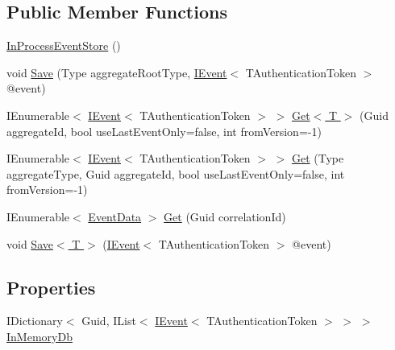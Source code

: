 \subsection*{Public Member Functions}
\begin{DoxyCompactItemize}
\item 
\hyperlink{classCqrs_1_1Ninject_1_1InProcess_1_1EventStore_1_1InProcessEventStore_a090c182760c5dc3792ebf5ac0dc7c5ee}{In\+Process\+Event\+Store} ()
\item 
void \hyperlink{classCqrs_1_1Ninject_1_1InProcess_1_1EventStore_1_1InProcessEventStore_a21816423f7b71249f3dc7ce14952e1e5}{Save} (Type aggregate\+Root\+Type, \hyperlink{interfaceCqrs_1_1Events_1_1IEvent}{I\+Event}$<$ T\+Authentication\+Token $>$ @event)
\item 
I\+Enumerable$<$ \hyperlink{interfaceCqrs_1_1Events_1_1IEvent}{I\+Event}$<$ T\+Authentication\+Token $>$ $>$ \hyperlink{classCqrs_1_1Ninject_1_1InProcess_1_1EventStore_1_1InProcessEventStore_a154f3f96109d63a3bf442a72c1bb0525}{Get$<$ T $>$} (Guid aggregate\+Id, bool use\+Last\+Event\+Only=false, int from\+Version=-\/1)
\item 
I\+Enumerable$<$ \hyperlink{interfaceCqrs_1_1Events_1_1IEvent}{I\+Event}$<$ T\+Authentication\+Token $>$ $>$ \hyperlink{classCqrs_1_1Ninject_1_1InProcess_1_1EventStore_1_1InProcessEventStore_a45144027681fe901b1f0db3de9dc7b21}{Get} (Type aggregate\+Type, Guid aggregate\+Id, bool use\+Last\+Event\+Only=false, int from\+Version=-\/1)
\item 
I\+Enumerable$<$ \hyperlink{classCqrs_1_1Events_1_1EventData}{Event\+Data} $>$ \hyperlink{classCqrs_1_1Ninject_1_1InProcess_1_1EventStore_1_1InProcessEventStore_ae07e89f6a8ca48d7d7f25d8a52703fbd}{Get} (Guid correlation\+Id)
\item 
void \hyperlink{classCqrs_1_1Ninject_1_1InProcess_1_1EventStore_1_1InProcessEventStore_a393924b175c56585bd4b5065d1b36f3e}{Save$<$ T $>$} (\hyperlink{interfaceCqrs_1_1Events_1_1IEvent}{I\+Event}$<$ T\+Authentication\+Token $>$ @event)
\end{DoxyCompactItemize}
\subsection*{Properties}
\begin{DoxyCompactItemize}
\item 
I\+Dictionary$<$ Guid, I\+List$<$ \hyperlink{interfaceCqrs_1_1Events_1_1IEvent}{I\+Event}$<$ T\+Authentication\+Token $>$ $>$ $>$ \hyperlink{classCqrs_1_1Ninject_1_1InProcess_1_1EventStore_1_1InProcessEventStore_a189745cc74bcc2f0caac135c87296242}{In\+Memory\+Db}
\end{DoxyCompactItemize}


